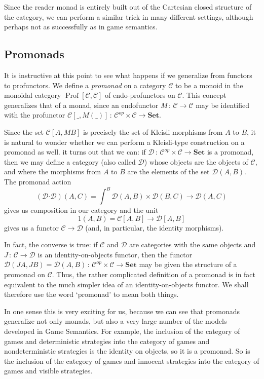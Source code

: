 \documentclass{svproc}
\newcommand\C{\mathcal{C}}
\newcommand\D{\mathcal{D}}
\newcommand\from{\,\colon\,}
\newcommand{\pfc}{\boldsymbol{\cdot}}
\newcommand{\catname}[1]{\mathbf{#1}}
\newcommand{\Set}{\catname{Set}}
\DeclareMathOperator{\Prof}{Prof}
\begin{document}
Since the reader monad is entirely built out of the Cartesian closed structure of the category, we can perform a similar trick in many different settings, although perhaps not as successfully as in game semantics.  

\subsection{Promonads}

It is instructive at this point to see what happens if we generalize from functors to profunctors.  
We define a \emph{promonad} on a category $\C$ to be a monoid in the monoidal category $\Prof[\C,\C]$ of endo-profunctors on $\C$.  
This concept generalizes that of a monad, since an endofunctor $M\from \C\to\C$ may be identified with the profunctor $\C[\_,M(\_)]\from \C^{op}\times\C\to\Set$.

Since the set $\C[A,MB]$ is precisely the set of Kleisli morphisms from $A$ to $B$, it is natural to wonder whether we can perform a Kleisli-type construction on a promonad as well.  
it turns out that we can: if $\D\from \C^{op}\times\C\to\Set$ is a promonad, then we may define a category (also called $\D$) whose objects are the objects of $\C$, and where the morphisms from $A$ to $B$ are the elements of the set $\D(A,B)$.
The promonad action
\[
  (\D\pfc\D)(A,C) = \int^{B}\D(A,B)\times\D(B,C) \to \D(A,C)
  \]
gives us composition in our category and the unit
\[
  1(A,B)=\C[A,B]\to \D[A,B]
  \]
gives us a functor $\C\to\D$ (and, in particular, the identity morphisms).

In fact, the converse is true: if $\C$ and $\D$ are categories with the same objects and $J\from \C\to\D$ is an identity-on-objects functor, then the functor $\D(JA,JB)=\D(A,B)\from\C^{op}\times\C\to\Set$ may be given the structure of a promonad on $\C$.  
Thus, the rather complicated definition of a promonad is in fact equivalent to the much simpler idea of an identity-on-objects functor.
We shall therefore use the word `promonad' to mean both things.

In one sense this is very exciting for us, because we can see that promonads generalize not only monads, but also a very large number of the models developed in Game Semantics.  
For example, the inclusion of the category of games and deterministic strategies into the category of games and nondeterministic strategies is the identity on objects, so it is a promonad.  
So is the inclusion of the category of games and innocent strategies into the category of games and visible strategies.  
\end{document}
